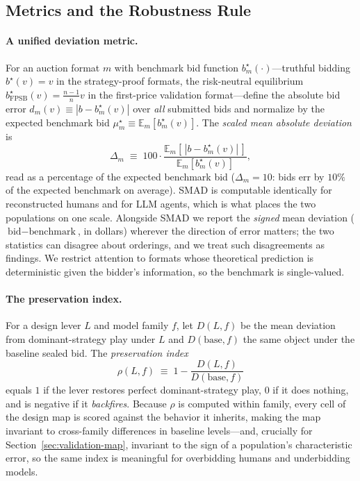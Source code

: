 \subsection{Metrics and the Robustness Rule}\label{sec:metrics}

\paragraph{A unified deviation metric.}
For an auction format $m$ with benchmark bid function $b^\star_m(\cdot)$---truthful bidding $b^\star(v)=v$ in the strategy-proof formats, the risk-neutral equilibrium $b^\star_{\text{FPSB}}(v)=\frac{n-1}{n}v$ in the first-price validation format---define the absolute bid error $d_m(v) \equiv |b - b^\star_m(v)|$ over \emph{all} submitted bids and normalize by the expected benchmark bid $\mu^\star_m \equiv \mathbb{E}_m[b^\star_m(v)]$. The \emph{scaled mean absolute deviation} is
\[
\Delta_m \;\equiv\; 100 \cdot \frac{\mathbb{E}_m\!\left[\,|b - b^\star_m(v)|\,\right]}{\mathbb{E}_m\!\left[b^\star_m(v)\right]},
\]
read as a percentage of the expected benchmark bid ($\Delta_m = 10$: bids err by $10\%$ of the expected benchmark on average). SMAD is computable identically for reconstructed humans and for LLM agents, which is what places the two populations on one scale. Alongside SMAD we report the \emph{signed} mean deviation ($\text{bid} - \text{benchmark}$, in dollars) wherever the direction of error matters; the two statistics can disagree about orderings, and we treat such disagreements as findings. We restrict attention to formats whose theoretical prediction is deterministic given the bidder's information, so the benchmark is single-valued.

\paragraph{The preservation index.}
For a design lever $L$ and model family $f$, let $D(L,f)$ be the mean deviation from dominant-strategy play under $L$ and $D(\text{base},f)$ the same object under the baseline sealed bid. The \emph{preservation index}
\[
\rho(L,f) \;\equiv\; 1 - \frac{D(L,f)}{D(\text{base},f)}
\]
equals $1$ if the lever restores perfect dominant-strategy play, $0$ if it does nothing, and is negative if it \emph{backfires}. Because $\rho$ is computed within family, every cell of the design map is scored against the behavior it inherits, making the map invariant to cross-family differences in baseline levels---and, crucially for Section~\ref{sec:validation-map}, invariant to the sign of a population's characteristic error, so the same index is meaningful for overbidding humans and underbidding models.

